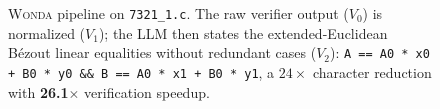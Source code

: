\documentclass[10pt]{article}
\begin{document}
\begin{figure}[ht!]
\caption{\textsc{Wonda} pipeline on \texttt{7321\_1.c}. The raw verifier output ($V_0$) is normalized ($V_1$); the LLM then states the extended-Euclidean B\'ezout linear equalities without redundant cases ($V_2$): \texttt{A == A0 * x0 + B0 * y0 \&\& B == A0 * x1 + B0 * y1}, a $24\times$ character reduction with \textbf{26.1$\times$} verification speedup.}
\label{fig:pipeline_showcase_7321_1_c}
\end{figure}
\end{document}
